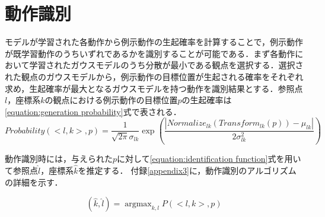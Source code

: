 
\section{動作識別}

モデルが学習された各動作から例示動作の生起確率を計算することで，例示動作が既学習動作のうちいずれであるかを識別することが可能である．まず各動作において学習されたガウスモデルのうち分散が最小である観点を選択する．選択された観点のガウスモデルから，例示動作の目標位置が生起される確率をそれぞれ求め，生起確率が最大となるガウスモデルを持つ動作を識別結果とする．参照点$l$，座標系$k$の観点における例示動作の目標位置$p$の生起確率は\ref{equation:generation probability}式で表される．
\begin{equation}[h]
	\label{equation:generation probability}
	Probability(<l , k> , p) = \frac{1}{\sqrt{2\pi}σ_{lk}}\exp \left(\frac{|Normalize_{lk}(Transform_{lk}(p))-μ_{lk}|}{2σ_{lk}^2}\right)
\end{equation}


動作識別時には，与えられた$p$に対して\ref{equation:identification function}式を用いて参照点$\hat{l}$，座標系$\hat{k}$を推定する．
付録\ref{appendix3}に，動作識別のアルゴリズムの詳細を示す．

\begin{equation}
	\label{equation:identification function}
	(\hat{k} , \hat{l}) =  \mathop{\arg\max}_{k , l}P(<l , k> , p)
\end{equation}

